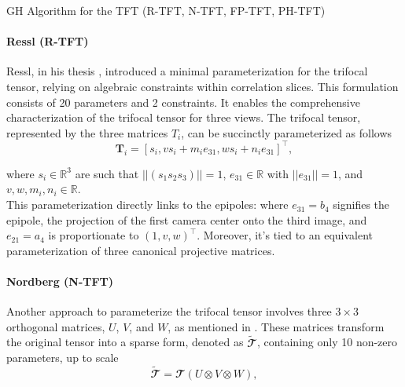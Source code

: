 \begin{algorithm}[h]
		\caption{\acs{GH} Algorithm for the \acs{TFT} (\acs{R-TFT}, \acs{N-TFT}, \acs{FP-TFT}, \acs{PH-TFT})}
\end{algorithm}

\paragraph{Ressl (\acs{R-TFT})}
Ressl, in his thesis \cite{9-ressl-param}, introduced a minimal parameterization for the trifocal tensor, relying on algebraic constraints within correlation slices. This formulation consists of 20 parameters and 2 constraints. It enables the comprehensive characterization of the trifocal tensor for three views. The trifocal tensor, represented by the three matrices \( T_i \), can be succinctly parameterized as follows
\begin{equation}
	\bm{T}_i = [s_i, vs_i + m_ie_{31}, ws_i + n_ie_{31}]^\top,
\end{equation}

where \( s_i \in \mathbb{R}^3 \) are such that \( || (s_1 s_2 s_3) || = 1 \), \( e_{31} \in \mathbb{R} \) with \( || e_{31} || = 1 \), and \( v, w, m_i, n_i \in \mathbb{R} \).\\

This parameterization directly links to the epipoles: where \( e_{31} = b_4 \) signifies the epipole, the projection of the first camera center onto the third image, and \( e_{21} = a_4 \) is proportionate to \( (1,v,w)^\top \). Moreover, it's tied to an equivalent parameterization of three canonical projective matrices.

\paragraph{Nordberg (\acs{N-TFT})}
Another approach to parameterize the trifocal tensor involves three \( 3 \times 3 \) orthogonal matrices, \( U \), \( V \), and \( W \), as mentioned in \cite{6-nordberg-param}. These matrices transform the original tensor into a sparse form, denoted as \( \bm{\widetilde{\mathbfcal{T}}} \), containing only 10 non-zero parameters, up to scale
\begin{equation}
	\bm{\widetilde{\mathbfcal{T}}} = \mathbfcal{T} (U \otimes V \otimes W),
\end{equation}

